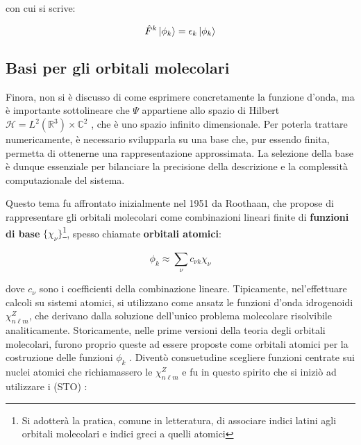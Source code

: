 con cui si scrive:

\begin{equation}\label{eqn:equazione-Hartree-Fock}
    \hat{F}^k \ket{\phi_k} = \epsilon_k \ket{\phi_k}
\end{equation}

\subsection{Basi per gli orbitali molecolari}\label{subsec:basi}

Finora, non si è discusso di come esprimere concretamente la funzione d’onda, ma è importante sottolineare che $\Psi$  appartiene allo spazio di Hilbert $\mathcal{H} = L^2(\mathbb{R}^3) \times \mathbb{C}^2$ , che è uno spazio infinito dimensionale. Per poterla trattare numericamente, è necessario svilupparla su una base che, pur essendo finita, permetta di ottenerne una rappresentazione approssimata. La selezione della base è dunque essenziale per bilanciare la precisione della descrizione e la complessità computazionale del sistema.

Questo tema fu affrontato inizialmente nel 1951 da Roothaan, che propose di rappresentare gli orbitali molecolari come combinazioni lineari finite di \textbf{funzioni di base} $\{\chi_\nu\}$\footnote{Si adotterà la pratica, comune in letteratura, di associare indici latini agli orbitali molecolari e indici greci a quelli atomici}, spesso chiamate \textbf{orbitali atomici}:

\begin{equation}\label{eqn:LCAO}
    \phi_k \approx \sum_{\nu}^{} c_{\nu k}\chi_\nu
\end{equation}

dove $c_\nu$ sono i coefficienti della combinazione lineare. Tipicamente, nel'effettuare calcoli su sistemi atomici, si utilizzano come ansatz le funzioni d'onda idrogenoidi $\chi_{n\ell m}^{Z}$, che derivano dalla soluzione dell'unico problema molecolare risolvibile analiticamente.
Storicamente, nelle prime versioni della teoria degli orbitali molecolari, furono proprio queste ad essere proposte come orbitali atomici per la costruzione delle funzioni $\phi_k$ \cite{Pople_1998}. Diventò consuetudine scegliere funzioni centrate sui nuclei atomici che richiamassero le $\chi_{n\ell m}^{Z}$ e fu in questo spirito che si iniziò ad utilizzare i  (STO) \cite{Echenique_2007}:


